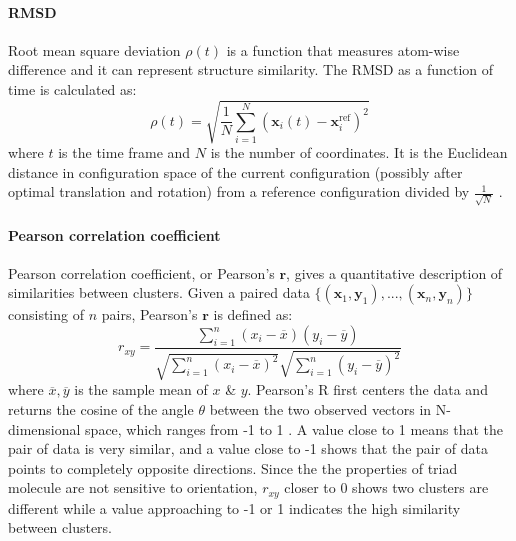 \documentclass[a4paper]{article}
\begin{document}
\paragraph{RMSD}
Root mean square deviation \( \rho(t) \) is a function that measures atom-wise difference and it can represent structure similarity. The RMSD as a function of time is calculated as:
\begin{equation}
    \rho(t)=\sqrt{\frac{1}{N}\sum_{i=1}^N\left(\bm{x}_i(t)-\bm{x}_i^\text{ref}\right)^2}
    \label{Eq: RMSD}
\end{equation}
\noindent where \(t\) is the time frame and \(N\) is the number of coordinates. It is the Euclidean distance in configuration space of the current configuration (possibly after optimal translation and rotation) from a reference configuration divided by \(\frac{1}{\sqrt{N}}\) \cite{scikit-learn}.

\paragraph{Pearson correlation coefficient}
Pearson correlation coefficient, or Pearson's \( \bm{r}\), gives a quantitative description of similarities between clusters. Given a paired data \(\{(\bm{x}_1, \bm{y}_1), ..., (\bm{x}_n, \bm{y}_n)\}\) consisting of \(n\) pairs, Pearson's \( \bm{r}\) is defined as:
\begin{equation}
    r_{xy} = \frac{\sum_{i=1}^n(x_i-\overline{x})(y_i-\overline{y})}{\sqrt{\sum_{i=1}^n(x_i-\overline{x})^2}\sqrt{\sum_{i=1}^n(y_i-\overline{y})^2}}
    \label{Eq: Pearson R}
\end{equation}
\noindent where \(\overline{x}, \overline{y}\) is the sample mean of \(x\) \& \(y\). Pearson's R first centers the data and returns the cosine of the angle \(\theta\) between the two observed vectors in N-dimensional space, which ranges from -1 to 1 \cite{PearsonR}. A value close to 1 means that the pair of data is very similar, and a value close to -1 shows that the pair of data points to completely opposite directions. Since the the properties of triad molecule are not sensitive to orientation, \(r_{xy}\) closer to 0 shows two clusters are different while a value approaching to -1 or 1 indicates the high similarity between clusters. 
\end{document}
